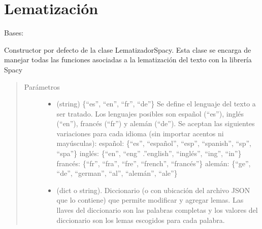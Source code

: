 \documentclass[letterpaper,10pt,openany,spanish]{sphinxmanual}
\begin{document}
\chapter{Lematización}
\label{\detokenize{funciones/lematizacion:module-lematizacion}}\label{\detokenize{funciones/lematizacion:lematizacion}}\label{\detokenize{funciones/lematizacion::doc}}

\begin{fulllineitems}
\label{\detokenize{funciones/lematizacion:lematizacion.LematizadorSpacy}}
Bases: 

Constructor por defecto de la clase LematizadorSpacy. Esta clase se         encarga de manejar todas las funciones asociadas a la lematización         del texto con la librería Spacy
\begin{quote}\begin{description}
\item[{Parámetros}] \leavevmode\begin{itemize}
\item {} 
 \textendash{} (string) \{“es”, “en”, “fr”, “de”\}  Se define el             lenguaje del texto a ser tratado. Los lenguajes posibles son español             (“es”), inglés (“en”), francés (“fr”) y alemán (“de”). Se aceptan las             siguientes variaciones para cada idioma (sin importar acentos ni mayúsculas):                    español: \{“es”, “español”, “esp”, “spanish”, “sp”, “spa”\} 
 inglés: \{“en”, “eng” .”english”, “inglés”, “ing”, “in”\} 
 francés: \{“fr”, “fra”, “fre”, “french”, “francés”\} 
 alemán: \{“ge”, “de”, “german”, “al”, “alemán”, “ale”\}   

\item {} 
 \textendash{} (dict o string). Diccionario (o  con ubicación del             archivo JSON que lo contiene) que permite modificar y agregar lemas. Las             llaves del diccionario son las palabras completas y los valores del             diccionario son los lemas escogidos para cada palabra.


\end{itemize}
\end{description}
\end{quote}
\end{fulllineitems}
\end{document}
